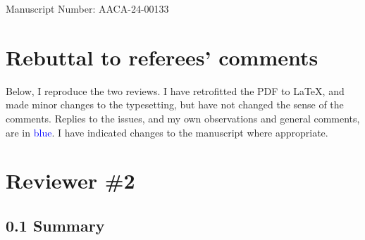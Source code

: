 \documentclass{article}
\begin{document}
Manuscript Number: AACA-24-00133

\section*{Rebuttal to referees' comments}

Below, I reproduce the two reviews.  I have retrofitted the PDF to
\LaTeX, and made minor changes to the typesetting, but have not
changed the sense of the comments.  Replies to the issues, and my own
observations and general comments, are in \textcolor{blue}{blue}.  I
have indicated changes to the manuscript where appropriate.


\section*{Reviewer \#2}


\subsection*{0.1 Summary}
\end{document}
